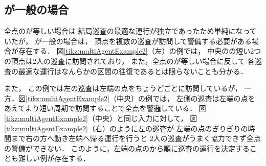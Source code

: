 
\subsection{{\idletime}が一般の場合}
\label{subsec:LineDifferentTimelimit}

全点の{\idletime}が等しい場合は
結局巡査の最適な運行が独立であったため単純になっていたが，
{\idletime}が一般の場合は，
頂点を複数の巡査が訪問して警備する必要がある場合が存在する．
%
図\ref{tikz:multiAgentExample2}（左）の例では，
中央の{\idletime}の短い2つの頂点は2人の巡査に訪問されており，
また，全点の{\idletime}が等しい場合に反して
各巡査の最適な運行はなんらかの区間の往復であるとは限らないことも分かる．


また，
この例では左の巡査は左端の点を{\idletime}ちょうどごとに訪問しているが，
一方，図\ref{tikz:multiAgentExample2}（中央）の例では，
左側の巡査は左端の点をあえてより短い周期で訪問することで全点を警邏している．
図\ref{tikz:multiAgentExample2}（中央）と同じ入力に対して，
図\ref{tikz:multiAgentExample2}（右）のように左の巡査が
左端の点の{\idletime}ぎりぎりの時間まで右の方へ動き左端へ帰る運行を行うと
2人の巡査がうまく協力できず全点の警備ができない．
このように，左端の点の{\idletime}から順に巡査の運行を決定することも難しい例が存在する．

